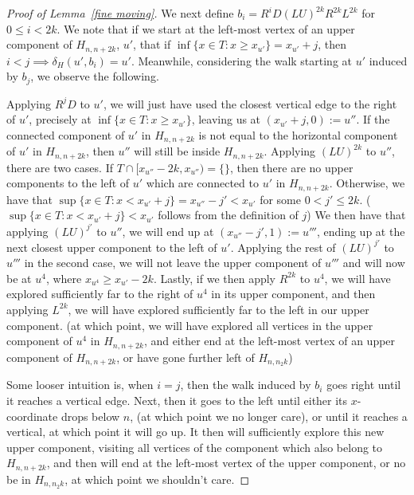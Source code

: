 \documentclass[a4paper]{article}
\theoremstyle{definition}
\begin{document}
\begin{proof}[Proof of Lemma~\ref*{fine moving}]
    We next define $b_i = R^iD(LU)^{2k}R^{2k}L^{2k}$ for $0\le i< 2k$. We note that if we start at the left-most vertex of an upper component of $H_{n,n+2k}$, $u'$, that if $\inf\{x\in T: x\ge x_{u'}\} = x_{u'}+ j$, then $i< j \implies \delta_H(u',b_i) = u'$. Meanwhile, considering the walk starting at $u'$ induced by $b_j$, we observe the following. 
    
    Applying $R^jD$ to $u'$, we will just have used the closest vertical edge to the right of $u'$, precisely at $\inf\{x\in T: x\ge x_{u'}\}$, leaving us at $(x_{u'}+j,0) := u''$. If the connected component of $u'$ in $H_{n,n+2k}$ is not equal to the horizontal component of $u'$ in $H_{n,n+2k}$, then $u''$ will still be inside $H_{n,n+2k}$. Applying $(LU)^{2k}$ to $u''$, there are two cases. If $T\cap [x_{u''}-2k,x_{u''}) = \{\}$, then there are no upper components to the left of $u'$ which are connected to $u'$ in $H_{n,n+2k}$. Otherwise, we have that $\sup\{x\in T: x< x_{u'}+j\} = x_{u''}-j'<x_{u'}$ for some $0<j'\le 2k$. ($\sup\{x\in T: x< x_{u'}+j\}<x_{u'}$ follows from the definition of $j$) We then have that applying $(LU)^{j'}$ to $u''$, we will end up at $(x_{u''}-j',1):=u'''$, ending up at the next closest upper component to the left of $u'$. Applying the rest of $(LU)^{j'}$ to $u'''$ in the second case, we will not leave the upper component of $u'''$ and will now be at $u^4$, where $x_{u^4}\ge x_{u'}-2k$. Lastly, if we then apply $R^{2k}$ to $u^4$, we will have explored sufficiently far to the right of $u^4$ in its upper component, and then applying $L^{2k}$, we will have explored sufficiently far to the left in our upper component. (at which point, we will have explored all vertices in the upper component of $u^4$ in $H_{n,n+2k}$, and either end at the left-most vertex of an upper component of $H_{n,n+2k}$, or have gone further left of $H_{n,n_2k}$)
    
    Some looser intuition is, when $i=j$, then the walk induced by $b_i$ goes right until it reaches a vertical edge. Next, then it goes to the left until either its $x$-coordinate drops below $n$, (at which point we no longer care), or until it reaches a vertical, at which point it will go up. It then will sufficiently explore this new upper component, visiting all vertices of the component which also belong to $H_{n,n+2k}$, and then will end at the left-most vertex of the upper component, or no be in $H_{n,n_2k}$, at which point we shouldn't care.
    

\end{proof}
\end{document}
